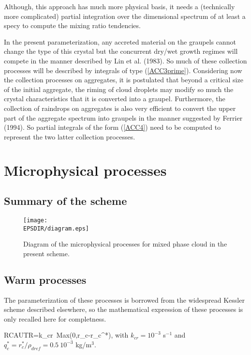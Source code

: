 Although, this approach has much more physical basis, it needs a (technically
more complicated) partial integration over the dimensional spectrum of at least
a specy to compute the mixing ratio tendencies.

In the present parameterization, any accreted material on the graupels cannot
change the type of this crystal but the concurrent dry/wet growth regimes will
compete in the manner described by Lin et al. (1983). So much of these
collection processes will be described by integrals of type (\ref{ACC3prime}).
Considering now the collection processes on aggregates, it is postulated that
beyond a critical size of the initial aggregate, the riming of cloud droplets
may modify so much the crystal characteristics that it is converted into a
graupel. Furthermore, the collection of raindrops on aggregates is also very
efficient to convert the upper part of the aggregate spectrum into graupels in
the manner suggested by Ferrier (1994). So partial integrals of the form
(\ref{ACC4}) need to be computed to represent the two latter collection processes.

\newpage
%
\section{Microphysical processes}
%
%
\subsection{Summary of the scheme}
%
\begin{figure}[!ht]
\centerline{\texttt{[image: \\EPSDIR/diagram.eps]}}
\caption{Diagram of the microphysical processes for mixed phase cloud in the present scheme.}
\label{mixfigdiagram}
\end{figure}

%
\subsection{Warm processes}
%
The parameterization of these processes is borrowed from the widespread Kessler
scheme described elsewhere, so the mathematical expression of these processes is
only recalled here for completness.

%
\be\label{WARM1}
RCAUTR=k_{cr}\ Max(0,r_c-r_c^*),
\ee
%
\noindent with $k_{cr}=10^{-3}$ s$^{-1}$ and
$q_c^*=r_c^*/\rho_{dref}=0.5\ 10^{-3}$ kg/m$^3$.


